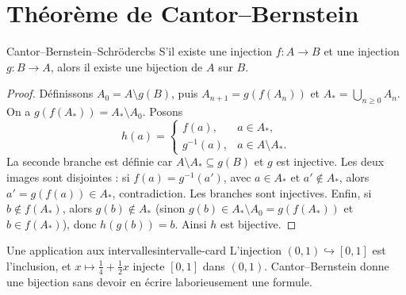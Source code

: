 \section{Théorème de Cantor--Bernstein}
\begin{theoreme}{Cantor--Bernstein--Schröder}{cbs}
S'il existe une injection $f:A\to B$ et une injection $g:B\to A$, alors il existe une bijection de $A$ sur $B$.
\end{theoreme}
\begin{proof}
Définissons $A_0=A\setminus g(B)$, puis $A_{n+1}=g(f(A_n))$ et $A_*=\bigcup_{n\ge0}A_n$. On a $g(f(A_*))=A_*\setminus A_0$. Posons
\[
h(a)=\begin{cases}f(a),&a\in A_*,\\g^{-1}(a),&a\in A\setminus A_* .\end{cases}
\]
La seconde branche est définie car $A\setminus A_*\subseteq g(B)$ et $g$ est injective. Les deux images sont disjointes : si $f(a)=g^{-1}(a')$, avec $a\in A_*$ et $a'\notin A_*$, alors $a'=g(f(a))\in A_*$, contradiction. Les branches sont injectives. Enfin, si $b\notin f(A_*)$, alors $g(b)\notin A_*$ (sinon $g(b)\in A_*\setminus A_0=g(f(A_*))$ et $b\in f(A_*)$), donc $h(g(b))=b$. Ainsi $h$ est bijective.
\end{proof}
\begin{exemple}{Une application aux intervalles}{intervalle-card}
L'injection $(0,1)\hookrightarrow[0,1]$ est l'inclusion, et $x\mapsto\frac14+\frac12x$ injecte $[0,1]$ dans $(0,1)$. Cantor--Bernstein donne une bijection sans devoir en écrire laborieusement une formule.
\end{exemple}

